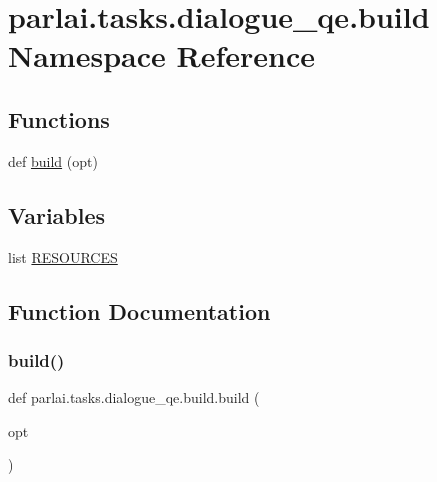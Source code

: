 \hypertarget{namespaceparlai_1_1tasks_1_1dialogue__qe_1_1build}{}\section{parlai.\+tasks.\+dialogue\+\_\+qe.\+build Namespace Reference}
\label{namespaceparlai_1_1tasks_1_1dialogue__qe_1_1build}
\subsection*{Functions}
\begin{DoxyCompactItemize}
\item 
def \hyperlink{namespaceparlai_1_1tasks_1_1dialogue__qe_1_1build_ab572df1748a38a9aa82871577c0cd8e6}{build} (opt)
\end{DoxyCompactItemize}
\subsection*{Variables}
\begin{DoxyCompactItemize}
\item 
list \hyperlink{namespaceparlai_1_1tasks_1_1dialogue__qe_1_1build_af0ab4b4e1f87decf7c4ff7549518511a}{R\+E\+S\+O\+U\+R\+C\+ES}
\end{DoxyCompactItemize}


\subsection{Function Documentation}
\mbox{\label{namespaceparlai_1_1tasks_1_1dialogue__qe_1_1build_ab572df1748a38a9aa82871577c0cd8e6}} 
\subsubsection{\texorpdfstring{build()}{build()}}
{\footnotesize\ttfamily def parlai.\+tasks.\+dialogue\+\_\+qe.\+build.\+build (\begin{DoxyParamCaption}\item[{}]{opt }\end{DoxyParamCaption})}



